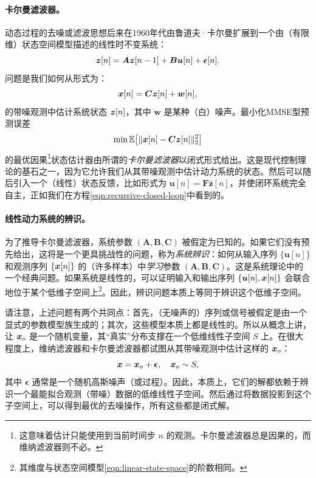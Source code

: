 \documentclass[../../book-main.tex]{subfiles}
\begin{document}
\paragraph{卡尔曼滤波器。} 
动态过程的去噪或滤波思想后来在1960年代由鲁道夫·卡尔曼扩展到一个由（有限维）状态空间模型描述的线性时不变系统：
\begin{equation}
    \bm{z}[n] = \boldsymbol{A} \bm{z}[n-1] + \boldsymbol{B}\boldsymbol{u}[n] + \boldsymbol{\epsilon}[n]. 
    \label{eqn:linear-state-space}
\end{equation}
问题是我们如何从形式为：\begin{equation}\bm{x}[n] = \boldsymbol{C} \bm{z}[n] + \boldsymbol{w}[n],
\label{eqn:Kalman-model}
\end{equation}
的带噪观测中估计系统状态 $\bm{z}[n]$，其中 $\boldsymbol{w}$ 是某种（白）噪声。最小化MMSE型预测误差
\begin{equation}
    \min \mathbb{E}\big[ \|\bm{x}[n] - \boldsymbol{C}\bm{z}[n]\|_2^2\big]
\end{equation}
的最优因果\footnote{这意味着估计只能使用到当前时间步 $n$ 的观测。卡尔曼滤波器总是因果的，而维纳滤波器则不必。}状态估计器由所谓的{\em 卡尔曼滤波器}\cite{kalman1960new}以闭式形式给出。这是现代控制理论的基石之一，因为它允许我们从其带噪观测中估计动力系统的状态。然后可以随后引入一个（线性）状态反馈，比如形式为 $\boldsymbol{u}[n] = \boldsymbol{F} \hat{\boldsymbol{z}}[n]$，并使闭环系统完全自主，正如我们在方程\eqref{eqn:recursive-closed-loop}中看到的。

\paragraph{线性动力系统的辨识。}
为了推导卡尔曼滤波器，系统参数 $(\boldsymbol{A}, \boldsymbol{B}, \boldsymbol{C})$ 被假定为已知的。如果它们没有预先给出，这将是一个更具挑战性的问题，称为{\em 系统辨识}：如何从输入序列 $\{\boldsymbol{u}[n]\}$ 和观测序列 $\{\bm{x}[n]\}$ 的（许多样本）中{\em 学习}参数 $(\boldsymbol{A}, \boldsymbol{B}, \boldsymbol{C})$。这是系统理论中的一个经典问题。如果系统是线性的，可以证明输入和输出序列 $\{\boldsymbol{u}[n], \bm{x}[n]\}$ 会联合地位于某个低维子空间上\footnote{其维度与状态空间模型\eqref{eqn:linear-state-space}的阶数相同。}。因此，辨识问题本质上等同于辨识这个低维子空间\cite{OverscheeP1996,Liu-2009-CDC,Liu-2010-SIAM}。

请注意，上述问题有两个共同点：首先，（无噪声的）序列或信号被假定是由一个显式的参数模型族生成的；其次，这些模型本质上都是线性的。所以从概念上讲，让 $\bm{x}_o$ 是一个随机变量，其“真实”分布支撑在一个低维线性子空间 $S$ 上。在很大程度上，维纳滤波器和卡尔曼滤波器都试图从其带噪观测中估计这样的 $\bm{x}_o$：
\begin{equation}
    \bm{x} = \bm{x}_o + \boldsymbol{\epsilon}, \quad \bm{x}_o \sim S, 
\end{equation}
其中 $\boldsymbol{\epsilon}$ 通常是一个随机高斯噪声（或过程）。因此，本质上，它们的解都依赖于辨识一个最能拟合观测（带噪）数据的低维线性子空间。然后通过将数据投影到这个子空间上，可以得到最优的去噪操作，所有这些都是闭式解。
\end{document}

